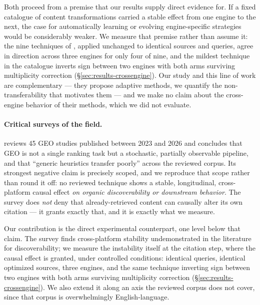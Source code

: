 \documentclass[11pt,a4paper]{article}
\begin{document}
Both proceed from a premise that our results supply direct evidence for. If
a fixed catalogue of content transformations carried a stable effect from
one engine to the next, the case for automatically learning or evolving
engine-specific strategies would be considerably weaker. We measure that
premise rather than assume it: the nine techniques of
\citet{aggarwal2024geo}, applied unchanged to identical sources and queries,
agree in direction across three engines for only four of nine, and the
mildest technique in the catalogue inverts sign between two engines with
both arms surviving multiplicity correction
(\S\ref{sec:results-crossengine}). Our study and this line of work are
complementary --- they propose adaptive methods, we quantify the
non-transferability that motivates them --- and we make no claim about the
cross-engine behavior of their methods, which we did not evaluate.

\paragraph{Critical surveys of the field.} \citet{martinez2026survey}
reviews 45 GEO studies published between 2023 and 2026 and concludes that
GEO is not a single ranking task but a stochastic, partially observable
pipeline, and that ``generic heuristics transfer poorly'' across the
reviewed corpus. Its strongest negative claim is precisely scoped, and we
reproduce that scope rather than round it off: no reviewed technique shows
a stable, longitudinal, cross-platform causal effect \emph{on organic
discoverability or downstream behavior}. The survey does \emph{not} deny
that already-retrieved content can causally alter its own citation --- it
grants exactly that, and it is exactly what we measure.

Our contribution is the direct experimental counterpart, one level below
that claim. The survey finds cross-platform stability undemonstrated in the
literature for discoverability; we measure the instability itself at the
citation step, where the causal effect is granted, under controlled
conditions: identical queries, identical optimized sources, three engines,
and the same technique inverting sign between two engines with both arms
surviving multiplicity correction (\S\ref{sec:results-crossengine}). We also extend it along
an axis the reviewed corpus does not cover, since that corpus is
overwhelmingly English-language.
\end{document}

